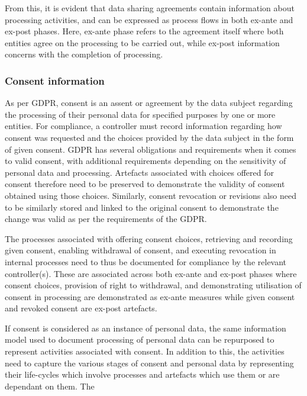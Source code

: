 From this, it is evident that data sharing agreements contain information about processing activities, and can be expressed as process flows in both ex-ante and ex-post phases. Here, ex-ante phase refers to the agreement itself where both entities agree on the processing to be carried out, while ex-post information concerns with the completion of processing.

\subsubsection{Consent information}
As per GDPR, consent is an assent or agreement by the data subject regarding the processing of their personal data for specified purposes by one or more entities. 
For compliance, a controller must record information regarding how consent was requested and the choices provided by the data subject in the form of given consent.
GDPR has several obligations and requirements when it comes to valid consent, with additional requirements depending on the sensitivity of personal data and processing. 
Artefacts associated with choices offered for consent therefore need to be preserved to demonstrate the validity of consent obtained using those choices.
Similarly, consent revocation or revisions also need to be similarly stored and linked to the original consent to demonstrate the change was valid as per the requirements of the GDPR.

The processes associated with offering consent choices, retrieving and recording given consent, enabling withdrawal of consent, and executing revocation in internal processes need to thus be documented for compliance by the relevant controller(s).
These are associated across both ex-ante and ex-post phases where consent choices, provision of right to withdrawal, and demonstrating utilisation of consent in processing are demonstrated as ex-ante measures while given consent and revoked consent are ex-post artefacts. 

If consent is considered as an instance of personal data, the same information model used to document processing of personal data can be repurposed to represent activities associated with consent. In addition to this, the activities need to capture the various stages of consent and personal data by representing their life-cycles which involve processes and artefacts which use them or are dependant on them. The 

